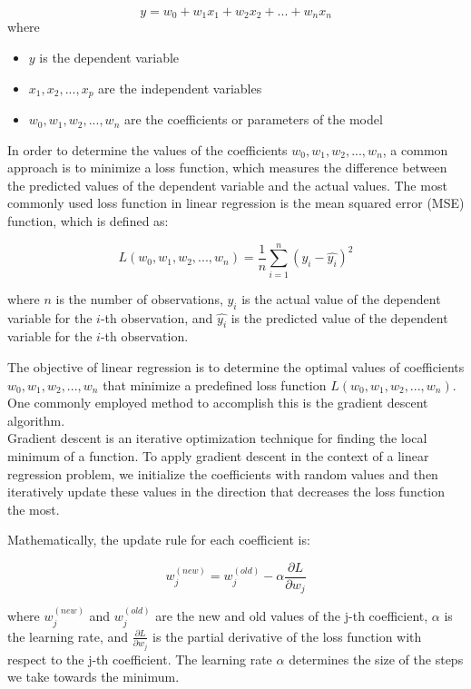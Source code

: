 \begin{equation}
	y = w_0 + w_1 x_1 + w_2 x_2 + ... + w_n x_n 
\end{equation}
 where 
\begin{itemize}
	\item $y$ is the dependent variable
	\item $x_1, x_2, ..., x_p$ are the independent variables
	\item $w_0, w_1, w_2, ..., w_n$ are the coefficients or parameters of the model
\end{itemize}

In order to determine the values of the coefficients $w_0, w_1, w_2, ..., w_n$, a common approach is to minimize a loss function, which measures the difference between the predicted values of the dependent variable and the actual values. The most commonly used loss function in linear regression is the mean squared error (MSE) function, which is defined as:

\begin{equation}
	L(w_0, w_1, w_2, ..., w_n) = \frac{1}{n} \sum_{i=1}^{n} (y_i - \hat{y_i})^2
\end{equation}

where $n$ is the number of observations, $y_i$ is the actual value of the dependent variable for the $i$-th observation, and $\hat{y_i}$ is the predicted value of the dependent variable for the $i$-th observation.


The objective of linear regression is to determine the optimal values of coefficients $w_0, w_1, w_2, ..., w_n$ that minimize a predefined loss function $L(w_0, w_1, w_2, ..., w_n)$. One commonly employed method to accomplish this is the gradient descent algorithm.\\


Gradient descent is an iterative optimization technique for finding the local minimum of a function. To apply gradient descent in the context of a linear regression problem, we initialize the coefficients with random values and then iteratively update these values in the direction that decreases the loss function the most.

Mathematically, the update rule for each coefficient is:

\begin{equation}
	w_j^{(new)} = w_j^{(old)} - \alpha \frac{\partial L}{\partial w_j}
\end{equation}


where $w_j^{(new)}$ and $w_j^{(old)}$ are the new and old values of the j-th coefficient, $\alpha$ is the learning rate, and $\frac{\partial L}{\partial w_j}$ is the partial derivative of the loss function with respect to the j-th coefficient. The learning rate $\alpha$ determines the size of the steps we take towards the minimum.

